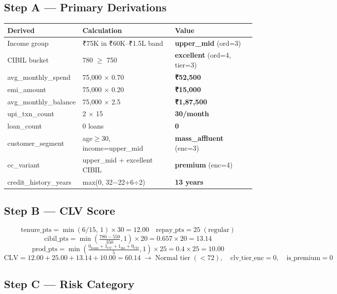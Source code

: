 \documentclass[12pt,a4paper]{article}
\begin{document}
\subsection{Step A — Primary Derivations}

\begin{tabular}{lll}
\toprule
\textbf{Derived} & \textbf{Calculation} & \textbf{Value} \\
\midrule
Income group    & ₹75K in ₹60K--₹1.5L band & \textbf{upper\_mid} (ord=3) \\
CIBIL bucket    & 780 $\geq$ 750 & \textbf{excellent} (ord=4, tier=3) \\
avg\_monthly\_spend & 75{,}000 $\times$ 0.70 & \textbf{₹52{,}500} \\
emi\_amount & 75{,}000 $\times$ 0.20 & \textbf{₹15{,}000} \\
avg\_monthly\_balance & 75{,}000 $\times$ 2.5 & \textbf{₹1{,}87{,}500} \\
upi\_txn\_count & 2 $\times$ 15 & \textbf{30/month} \\
loan\_count & 0 loans & \textbf{0} \\
customer\_segment & age$\geq$30, income=upper\_mid & \textbf{mass\_affluent} (enc=3) \\
cc\_variant & upper\_mid + excellent CIBIL & \textbf{premium} (enc=4) \\
credit\_history\_years & max(0, 32$-$22+6$\div$2) & \textbf{13 years} \\
\bottomrule
\end{tabular}

\subsection{Step B — CLV Score}

\[
\text{tenure\_pts} = \min(6/15,\,1)\times30 = \mathbf{12.00}
\quad
\text{repay\_pts} = 25\;(\text{regular})
\]
\[
\text{cibil\_pts} = \min\!\left(\tfrac{780-550}{350},1\right)\times20 = 0.657\times20 = \mathbf{13.14}
\]
\[
\text{prod\_pts} = \min\!\left(\tfrac{0_\text{loans}+1_\text{CC}+1_\text{ins}+0_\text{CD}}{5},1\right)\times25 = 0.4\times25 = \mathbf{10.00}
\]
\[
\boxed{\text{CLV} = 12.00+25.00+13.14+10.00 = \mathbf{60.14} \;\rightarrow\; \text{Normal tier}\;(<72),\quad\text{clv\_tier\_enc}=0,\quad\text{is\_premium}=0}
\]

\subsection{Step C — Risk Category}
\end{document}
